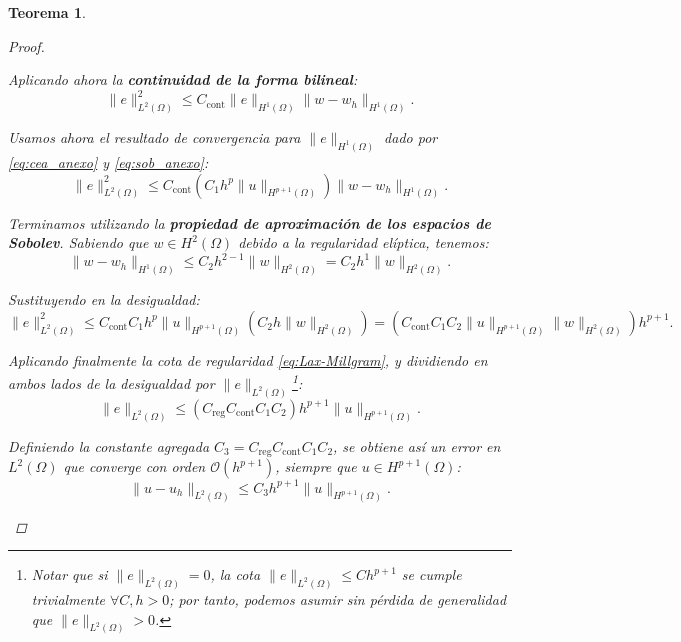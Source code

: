 \documentclass[11pt]{book}
\theoremstyle{plain} %
\newtheorem{teorema}{Teorema}[chapter]
\theoremstyle{definition} %
\theoremstyle{definition} %
\begin{document}
\begin{teorema}
\begin{proof}
\begin{itemize}
    Aplicando ahora la \textbf{continuidad de la forma bilineal}:
    \begin{equation*}
        \|e\|_{L^2(\Omega)}^2 \leq C_{\text{cont}} \|e\|_{H^1(\Omega)} \|w - w_h\|_{H^1(\Omega)}.
    \end{equation*}

    Usamos ahora el resultado de convergencia para $\|e\|_{H^1(\Omega)}$ dado por \eqref{eq:cea_anexo} y \eqref{eq:sob_anexo}:
    \begin{equation*}
        \|e\|_{L^2(\Omega)}^2 \leq C_{\text{cont}} \left( C_1 h^p \|u\|_{H^{p+1}(\Omega)} \right) \|w - w_h\|_{H^1(\Omega)}.
    \end{equation*}
    
    Terminamos utilizando la \textbf{propiedad de aproximación de los espacios de Sobolev}. Sabiendo que $w\in H^2(\Omega)$ debido a la regularidad elíptica, tenemos:
    \begin{equation*}
        \|w - w_h\|_{H^1(\Omega)} \leq C_{2} h^{2-1} \|w\|_{H^{2}(\Omega)} = C_{2} h^{1} \|w\|_{H^{2}(\Omega)}.
    \end{equation*}

    Sustituyendo en la desigualdad:
    \begin{equation*}
        \|e\|_{L^2(\Omega)}^2 \leq C_{\text{cont}} C_1 h^p \|u\|_{H^{p+1}(\Omega)} \left( C_{2} h \|w\|_{H^{2}(\Omega)} \right) = \left( C_{\text{cont}} C_1 C_{2} \|u\|_{H^{p+1}(\Omega)} \|w\|_{H^{2}(\Omega)} \right)h^{p+1}.
    \end{equation*}

    Aplicando finalmente la cota de regularidad \eqref{eq:Lax-Millgram}, y dividiendo en ambos lados de la desigualdad por $\|e\|_{L^2(\Omega)}$\footnote{Notar que si $\|e\|_{L^2(\Omega)}=0$, la cota $\|e\|_{L^2(\Omega)} \leq C h^{p+1}$ se cumple trivialmente $\forall C,h>0$; por tanto, podemos asumir sin pérdida de generalidad que $\|e\|_{L^2(\Omega)}>0$.}:
    \begin{equation*}
        \|e\|_{L^2(\Omega)} \leq \left( C_{\text{reg}} C_{\text{cont}} C_1 C_{2} \right) h^{p+1} \|u\|_{H^{p+1}(\Omega)}.
    \end{equation*}

    Definiendo la constante agregada $C_3 = C_{\text{reg}} C_{\text{cont}} C_1 C_{2}$, se obtiene así un error en $L^2(\Omega)$ que converge con orden $\mathcal{O}(h^{p+1})$, siempre que $u\in H^{p+1}(\Omega)$:
    \begin{equation*}
        \|u - u_h\|_{L^2(\Omega)} \leq C_3 h^{p+1} \|u\|_{H^{p+1}(\Omega)}.
    \end{equation*}
    \end{itemize}
    \end{proof}
\end{teorema}
\end{document}
